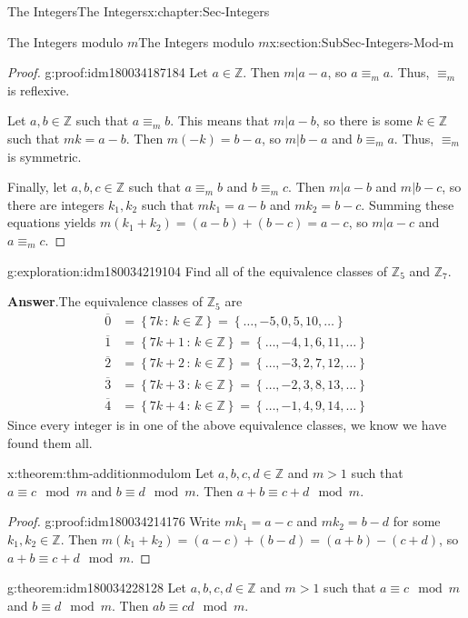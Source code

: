 \documentclass[oneside,10pt,]{book}
\newcommand{\blocktitlefont}{\relax}
\numberwithin{equation}{section}
\newcommand{\set}[1]{\left\{ {#1} \right\}}
\newcommand{\setof}[2]{{\left\{#1\,\colon\,#2\right\}}}
\def\Z{{\mathbb Z}}
\newcommand{\amp}{&}
\begin{document}
\begin{chapterptx}{The Integers}{}{The Integers}{}{}{x:chapter:Sec-Integers}
\begin{sectionptx}{The Integers modulo \(m\)}{}{The Integers modulo \(m\)}{}{}{x:section:SubSec-Integers-Mod-m}
\begin{proof}{}{g:proof:idm180034187184}
Let \(a\in \Z\). Then \(m|a-a\), so \(a \equiv_m a\). Thus, \(\equiv_m\) is reflexive.%
\par
Let \(a,b\in \Z\) such that \(a\equiv_m b\). This means that \(m|a-b\), so there is some \(k\in \Z\) such that \(mk = a-b\). Then \(m(-k) = b-a\), so \(m|b-a\) and \(b \equiv_m a\). Thus, \(\equiv_m\) is symmetric.%
\par
Finally, let \(a,b,c\in \Z\) such that \(a\equiv_m b\) and \(b\equiv_m c\). Then \(m|a-b\) and \(m|b-c\), so there are integers \(k_1, k_2\) such that \(m k_1 = a-b\) and \(m k_2 = b-c\). Summing these equations yields \(m(k_1 + k_2) = (a-b) + (b-c) = a-c\), so \(m|a-c\) and \(a\equiv_m c\).%
\end{proof}
\label{g:notation:idm180034180880}%
\begin{exploration}{}{g:exploration:idm180034219104}%
Find all of the equivalence classes of \(\Z_5\) and \(\Z_7\).%
\par\smallskip%
\noindent\textbf{\blocktitlefont Answer}.\hypertarget{g:answer:idm180034217712}{}\quad{}The equivalence classes of \(\Z_5\) are%
\begin{align*}
\overline{0} \amp = \setof{7k}{k\in\Z} = \set{\ldots, -5, 0, 5, 10, \ldots}\\
\overline{1} \amp = \setof{7k+1}{k\in\Z} = \set{\ldots, -4, 1, 6, 11, \ldots}\\
\overline{2} \amp = \setof{7k+2}{k\in\Z} = \set{\ldots, -3, 2, 7, 12, \ldots}\\
\overline{3} \amp = \setof{7k+3}{k\in\Z} = \set{\ldots, -2, 3, 8, 13, \ldots}\\
\overline{4} \amp = \setof{7k+4}{k\in\Z} = \set{\ldots, -1, 4, 9, 14, \ldots}
\end{align*}
Since every integer is in one of the above equivalence classes, we know we have found them all.%
\end{exploration}
\begin{theorem}{}{}{x:theorem:thm-additionmodulom}%
Let \(a,b, c,d\in \Z\) and \(m > 1\) such that \(a\equiv c\mod m\) and \(b\equiv d\mod m\). Then \(a+b \equiv c + d \mod m\).%
\end{theorem}
\begin{proof}{}{g:proof:idm180034214176}
Write \(mk_1 = a-c\) and \(m k_2 = b-d\) for some \(k_1,k_2\in \Z\). Then \(m(k_1 + k_2) = (a-c) + (b-d) = (a+b) - (c+d)\), so \(a+b \equiv c+d\mod m\).%
\end{proof}
\begin{theorem}{}{}{g:theorem:idm180034228128}%
Let \(a,b, c,d\in \Z\) and \(m > 1\) such that \(a\equiv c\mod m\) and \(b\equiv d\mod m\). Then \(ab \equiv c d\mod m\).%

\end{theorem}
\end{sectionptx}
\end{chapterptx}
\end{document}
